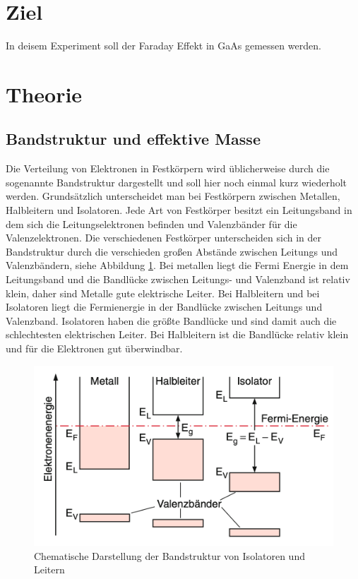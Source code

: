 \section{Ziel}
In deisem Experiment soll der Faraday Effekt in GaAs gemessen werden.
\section{Theorie}
\label{sec:Theorie}
\subsection{Bandstruktur und effektive Masse}
Die Verteilung von Elektronen in Festkörpern wird üblicherweise durch die sogenannte Bandstruktur dargestellt und soll hier noch einmal kurz wiederholt werden.
Grundsätzlich unterscheidet man bei Festkörpern zwischen Metallen, Halbleitern und Isolatoren.
Jede Art von Festkörper besitzt ein Leitungsband in dem sich die Leitungselektronen befinden und Valenzbänder für die Valenzelektronen.
Die verschiedenen Festkörper unterscheiden sich in der Bandstruktur durch die verschieden großen Abstände zwischen Leitungs und Valenzbändern, siehe Abbildung \ref{fig:bandstruk}.
Bei metallen liegt die Fermi Energie in dem Leitungsband und die Bandlücke zwischen Leitungs- und Valenzband ist relativ klein, daher sind Metalle gute elektrische Leiter.
Bei Halbleitern und bei Isolatoren liegt die Fermienergie in der Bandlücke zwischen Leitungs und Valenzband. 
Isolatoren haben die größte Bandlücke und sind damit auch die schlechtesten elektrischen Leiter. 
Bei Halbleitern ist die Bandlücke relativ klein und für die Elektronen gut überwindbar.
\begin{figure}[ht]
    \centering
    \includegraphics[scale = 0.5]{./bilder/Bandstruktur_demtroeder.png}
    \caption{Chematische Darstellung der Bandstruktur von Isolatoren und Leitern \cite{demtröder}}
    \label{fig:bandstruk}
\end{figure}

